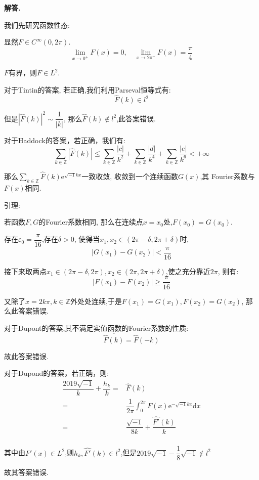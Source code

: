 \documentclass[12pt, a4paper, oneside]{ctexart}
\newenvironment{solution}{\par\noindent\textbf{解答. }}{\par}
\begin{document}
\begin{solution}
  \par
  我们先研究函数性态:\par
  显然$F\in C^{\infty}(0,2\pi)$.
  $$
   \lim_{x \to 0^+}F(x)=0, \quad \lim_{x \to 2\pi^-}F(x)=\dfrac{\pi}{4}
  $$
  \par
  $F$有界，则$F\in L^2$.
  \par
  对于Tintin的答案, 若正确,我们利用Parseval恒等式有:
  $$
   \widehat{F}(k)\in l^2
  $$
  \par
  但是$\left|\widehat{F}(k)\right| ^2\sim \dfrac{1}{|k|}$,
   那么$\widehat{F}(k)\notin l^2$,此答案错误.
\par
\quad
\par
\quad
\par
对于Haddock的答案，若正确，我们有:
$$
\sum_{k\in \mathbb{Z}}\left|\widehat{F}(k)\right|
\leqslant \sum_{k\in \mathbb{Z}}\dfrac{|c|}{k^2}
+\sum_{k\in \mathbb{Z}}\dfrac{|d|}{k^4}+
\sum_{k\in \mathbb{Z}}\dfrac{|e|}{k^6}
<+\infty
$$
\par
那么$\sum_{k\in\mathbb{Z} }\widehat{F}(k)\mathrm{e}^{\sqrt{-1}kx}$一致收敛, 
收敛到一个连续函数$G(x)$,其 Fourier系数与$F(x)$相同.
\par
\quad
\par
引理: 
\par
若函数$F,G$的Fourier系数相同, 那么在连续点$x=x_0$处,$F(x_0)=G(x_0)$.
\par
\quad
\par
存在$\varepsilon_0=\dfrac{\pi}{16}$,存在$\delta>0$,
使得当$x_1, x_2\in (2\pi-\delta,2\pi+\delta)$时,
$$
|G(x_1)-G(x_2)|<\dfrac{\pi}{16}
$$
\par
接下来取两点$x_1\in(2\pi-\delta,2\pi),x_2\in (2\pi,2\pi+\delta)$,使之充分靠近$2\pi$,
则有:
$$
|F(x_1)-F(x_2)|\geqslant \dfrac{\pi}{16}
$$
\par
又除了$x=2k\pi, k\in \mathbb{Z}$外处处连续,于是$F(x_1)=G(x_1),F(x_2)=G(x_2)$,
那么此答案错误.
\par
\quad
\par
\quad
\par
对于Dupont的答案,其不满足实值函数的Fourier系数的性质:
$$
\overline{\widehat{F}(k)}=\widehat{F}(-k)
$$
\par
故此答案错误.
\par
\quad
\par
\quad
\par
对于Dupond的答案，若正确，则:
$$
\begin{aligned}
\dfrac{2019\sqrt{-1}}{k}+\dfrac{h_k}{k}=&\widehat{F}(k)\\
=&\dfrac{1}{2\pi}\int_{0}^{2\pi}F(x)\mathrm{e}^{-\sqrt{-1}kx}\mathrm{d}x\\
=&\dfrac{\sqrt{-1}}{8k}+\dfrac{\widehat{F'}(k)}{k}\\
\end{aligned}
$$
\par
其中由$F'(x)\in L^2$,则$h_k,\widehat{F'}(k)\in l^2$,但是$2019\sqrt{-1}-\dfrac{1}{8}\sqrt{-1}\notin l^2$
\par
故其答案错误.


\end{solution}
\end{document}
